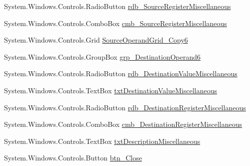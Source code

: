 \begin{DoxyCompactItemize}
System.\+Windows.\+Controls.\+Radio\+Button \hyperlink{class_c_p_u___o_s___simulator_1_1_instructions_window_ad2b0098ef721214b53b9e3241e611a84}{rdb\+\_\+\+Source\+Register\+Miscellaneous}
\item 
System.\+Windows.\+Controls.\+Combo\+Box \hyperlink{class_c_p_u___o_s___simulator_1_1_instructions_window_a98245ef6ca4796b7f59fe4b9937a388e}{cmb\+\_\+\+Source\+Register\+Miscellaneous}
\item 
System.\+Windows.\+Controls.\+Grid \hyperlink{class_c_p_u___o_s___simulator_1_1_instructions_window_a3dfdd68ad6b08fb1612fd43a420e5193}{Source\+Operand\+Grid\+\_\+\+Copy6}
\item 
System.\+Windows.\+Controls.\+Group\+Box \hyperlink{class_c_p_u___o_s___simulator_1_1_instructions_window_a8e457b3503625b5e837320ad9eb439c6}{grp\+\_\+\+Destination\+Operand6}
\item 
System.\+Windows.\+Controls.\+Radio\+Button \hyperlink{class_c_p_u___o_s___simulator_1_1_instructions_window_a567c8bba810d30e3c382e527e132a230}{rdb\+\_\+\+Destination\+Value\+Miscellaneous}
\item 
System.\+Windows.\+Controls.\+Text\+Box \hyperlink{class_c_p_u___o_s___simulator_1_1_instructions_window_a7fa1615bacb3264ac8ce61787a28d477}{txt\+Destination\+Value\+Miscellaneous}
\item 
System.\+Windows.\+Controls.\+Radio\+Button \hyperlink{class_c_p_u___o_s___simulator_1_1_instructions_window_adc4aa664244631ae1240a81d5c3b8ab5}{rdb\+\_\+\+Destination\+Register\+Miscellaneous}
\item 
System.\+Windows.\+Controls.\+Combo\+Box \hyperlink{class_c_p_u___o_s___simulator_1_1_instructions_window_ac4dab6ef32a46a295d6937b6bbda7813}{cmb\+\_\+\+Destination\+Register\+Miscellaneous}
\item 
System.\+Windows.\+Controls.\+Text\+Box \hyperlink{class_c_p_u___o_s___simulator_1_1_instructions_window_aaf938911ac6e23d7d637245cf40e6cbe}{txt\+Description\+Miscellaneous}
\item 
System.\+Windows.\+Controls.\+Button \hyperlink{class_c_p_u___o_s___simulator_1_1_instructions_window_a06305ca0735ae2d93a331fb33d2fe88f}{btn\+\_\+\+Close}
\end{DoxyCompactItemize}
